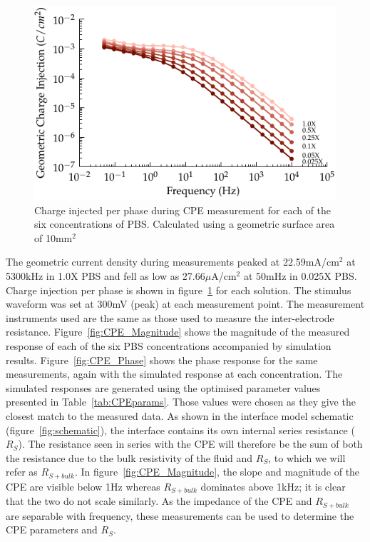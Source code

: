 \documentclass[journal, a4paper]{IEEEtran}
\begin{document}
\begin{figure}
    \begin{center}
        \includegraphics{graphics/chargeInjectionVsFrequency_magnitude}
    \end{center}
    \caption{\color{blue} Charge injected per phase during CPE measurement for each of the six concentrations of PBS. Calculated using a geometric surface area of 10\thinspace mm$^{2}$}
    \label{fig:chargeInjectionVsFrequency}
\end{figure}
{
    \color{blue}
    The geometric current density during measurements peaked at 22.59\thinspace mA/cm$^{2}$ at 5300\thinspace kHz in 1.0X PBS and fell as low as 27.66\thinspace $\mu$A/cm$^{2}$ at 50\thinspace mHz in 0.025X PBS. Charge injection per phase is shown in figure~\ref{fig:chargeInjectionVsFrequency} for each solution. 
The stimulus waveform was set at 300\thinspace mV (peak) at each measurement point. The measurement instruments used are the same as those used to measure the inter-electrode resistance.
}
{
    \color{blue}
Figure~\ref{fig:CPE_Magnitude} shows the magnitude of the measured response of each of the six PBS concentrations accompanied by simulation results. Figure~\ref{fig:CPE_Phase} shows the phase response for the same measurements, again with the simulated response at each concentration. The simulated responses are generated using the optimised parameter values presented in Table~\ref{tab:CPEparams}. Those values were chosen as they give the closest match to the measured data.
}
As shown in the interface model schematic (figure~\ref{fig:schematic}), the interface contains its own internal series resistance ($R_{S}$). The resistance seen in series with the CPE will therefore be the sum of both the resistance due to the bulk resistivity of the fluid and $R_{S}$, to which we will refer as $R_{S+bulk}$.
In figure~\ref{fig:CPE_Magnitude}, the slope and magnitude of the CPE are visible below 1\thinspace Hz whereas $R_{S+bulk}$  dominates above 1\thinspace kHz; it is clear that the two do not scale similarly.
As the impedance of the CPE and $R_{S+bulk}$ are separable with frequency, these measurements can be used to determine the CPE parameters and $R_{S}$.
\end{document}
